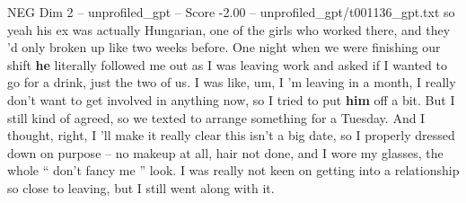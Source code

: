 \begin{textsample}{NEG Dim 2 – unprofiled\_gpt – Score -2.00 – unprofiled\_gpt/t001136\_gpt.txt}  \label{ex:f2_neg_030}
so yeah his ex was actually Hungarian, one of the girls who worked there, and they ’d only broken up like two weeks before.
One night when we were finishing our shift \textbf{he} literally followed me out as I was leaving work and asked if I wanted to go for a drink, just the two of us.
I was like, um, I ’m leaving in a month, I really don't want to get involved in anything now, so I tried to put \textbf{him} off a bit.
But I still kind of agreed, so we texted to arrange something for a Tuesday.
And I thought, right, I ’ll make it really clear this isn't a big date, so I properly dressed down on purpose – no makeup at all, hair not done, and I wore my glasses, the whole “ don't fancy me ” look.
I was really not keen on getting into a relationship so close to leaving, but I still went along with it.

\end{textsample}
